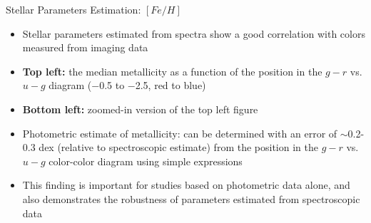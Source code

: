 \documentclass[letterpaper,landscape]{slides}
\begin{document}
\begin{slide}
{\begin{minipage}[t]{16cm}
\begin{center}
\vskip -1in
{\large \color{red} Stellar Parameters Estimation: $[Fe/H]$}
\end{center}
\begin{itemize}
\item {\color{blue} Stellar parameters estimated from spectra show a good correlation with
      colors measured from imaging data}
\item {\bf Top left:} the median metallicity as a function of 
     the position in the $g-r$ vs. $u-g$ diagram  ($-$0.5 to $-$2.5, red to blue)
\item {\bf Bottom left:} zoomed-in version of the top left figure
\item {\color{blue} Photometric estimate of metallicity:} can be determined with 
      an error of $\sim$0.2-0.3 dex (relative to spectroscopic estimate) from the position 
      in the $g-r$ vs. $u-g$ color-color diagram using simple expressions
\item {\color{red} This finding is important for studies based on photometric data alone, and also
      demonstrates the robustness of parameters estimated from spectroscopic data}
\end{itemize} 
\end{minipage}}
\vfill 
\end{slide}

\end{document}
